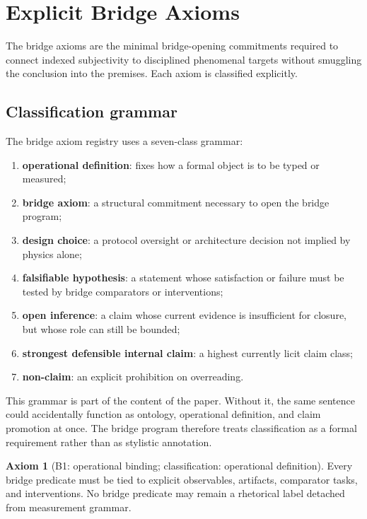 \documentclass[11pt,a4paper]{article}
\theoremstyle{definition}
\newtheorem{axiom}[theorem]{Axiom}
\begin{document}
\section{Explicit Bridge Axioms}
The bridge axioms are the minimal bridge-opening commitments required to connect indexed subjectivity to disciplined phenomenal targets without smuggling the conclusion into the premises. Each axiom is classified explicitly.

\subsection{Classification grammar}
The bridge axiom registry uses a seven-class grammar:
\begin{enumerate}[leftmargin=1.5em]
\item \textbf{operational definition}: fixes how a formal object is to be typed or measured;
\item \textbf{bridge axiom}: a structural commitment necessary to open the bridge program;
\item \textbf{design choice}: a protocol oversight or architecture decision not implied by physics alone;
\item \textbf{falsifiable hypothesis}: a statement whose satisfaction or failure must be tested by bridge comparators or interventions;
\item \textbf{open inference}: a claim whose current evidence is insufficient for closure, but whose role can still be bounded;
\item \textbf{strongest defensible internal claim}: a highest currently licit claim class;
\item \textbf{non-claim}: an explicit prohibition on overreading.
\end{enumerate}

This grammar is part of the content of the paper. Without it, the same sentence could accidentally function as ontology, operational definition, and claim promotion at once. The bridge program therefore treats classification as a formal requirement rather than as stylistic annotation.

\begin{axiom}[B1: operational binding; classification: operational definition]
Every bridge predicate must be tied to explicit observables, artifacts, comparator tasks, and interventions. No bridge predicate may remain a rhetorical label detached from measurement grammar.
\end{axiom}
\end{document}
